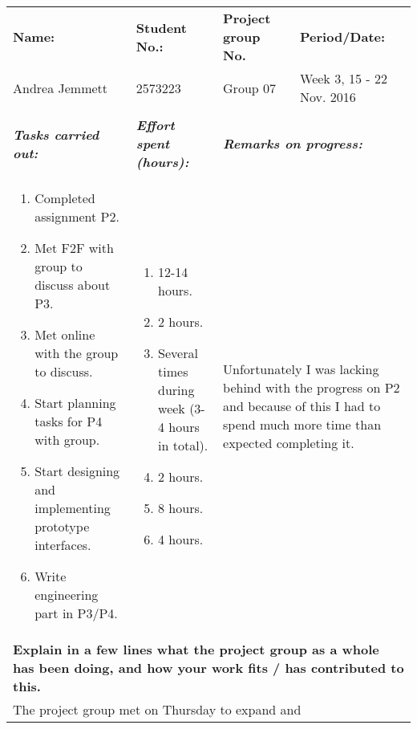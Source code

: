 \documentclass[a4paper]{article}
\begin{document}
\begin{center}
  \bgroup
  \def\arraystretch{1.5}
  \begin{tabular}{ | p{6cm} | p{6cm} | p{6cm} | p{6cm} | }
    \hline
    \textbf{Name:} &
    \textbf{Student No.:} &
    \textbf{Project group No.} &
    \textbf{Period/Date:} \\
    Andrea Jemmett &
    2573223 &
    Group 07 &
    Week 3, 15 - 22 Nov. 2016 \\
    \hline
    \rowcolor{yellow!25}\multicolumn{4}{|p{24cm}|}{\textbf{Past week:}} \\
    \hline
    \textbf{\textit{Tasks carried out:}} &
    \textbf{\textit{Effort spent (hours):}} &
    \multicolumn{2}{|l|}{\textbf{\textit{Remarks on progress:}}} \\
    \begin{enumerate}
      \vspace{-6mm}
      \item Completed assignment P2.
      \item Met F2F with group to discuss about P3.
      \item Met online with the group to discuss.
      \item Start planning tasks for P4 with group.
      \item Start designing and implementing prototype interfaces.
      \item Write engineering part in P3/P4.
    \end{enumerate} &
    \begin{enumerate}
      \vspace{-6mm}
      \item 12-14 hours.
      \item 2 hours.
      \item Several times during week (3-4 hours in total).
      \item 2 hours.
      \item 8 hours.
      \item 4 hours.
    \end{enumerate} &
    \multicolumn{2}{|p{12cm}|}{Unfortunately I was lacking behind with the
    progress on P2 and because of this I had to spend much more time than
    expected completing it.} \\
    \hline
    \multicolumn{4}{|p{24cm}|}{\textbf{Explain in a few lines what the project
    group as a whole has been doing, and how your work fits / has contributed
    to this.}} \\
    \multicolumn{4}{|p{24cm}|}{The project group met on Thursday to expand and
}
\end{tabular}
\end{center}
\end{document}
